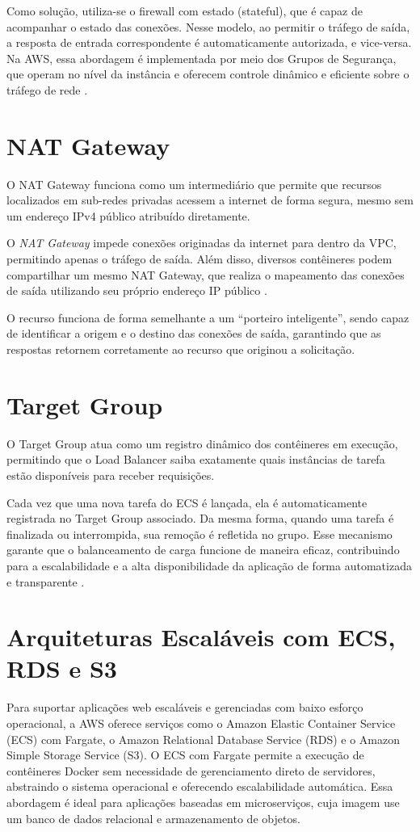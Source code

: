 Como solução, utiliza-se o firewall com estado (stateful), que é capaz de acompanhar o estado das conexões. Nesse modelo, ao permitir o tráfego de saída, a resposta de entrada correspondente é automaticamente autorizada, e vice-versa. Na AWS, essa abordagem é implementada por meio dos Grupos de Segurança, que operam no nível da instância e oferecem controle dinâmico e eficiente sobre o tráfego de rede \cite{fortinet2024firewall}.

\section{NAT Gateway}O NAT Gateway funciona como um intermediário que permite que recursos localizados em sub-redes privadas acessem a internet de forma segura, mesmo sem um endereço IPv4 público atribuído diretamente.

O \textit{NAT Gateway} impede conexões originadas da internet para dentro da VPC, permitindo apenas o tráfego de saída. Além disso, diversos contêineres podem compartilhar um mesmo NAT Gateway, que realiza o mapeamento das conexões de saída utilizando seu próprio endereço IP público \cite{google2024cloudnat}.

O recurso funciona de forma semelhante a um “porteiro inteligente”, sendo capaz de identificar a origem e o destino das conexões de saída, garantindo que as respostas retornem corretamente ao recurso que originou a solicitação.

\section{Target Group}O Target Group atua como um registro dinâmico dos contêineres em execução, permitindo que o Load Balancer saiba exatamente quais instâncias de tarefa estão disponíveis para receber requisições.

Cada vez que uma nova tarefa do ECS é lançada, ela é automaticamente registrada no Target Group associado. Da mesma forma, quando uma tarefa é finalizada ou interrompida, sua remoção é refletida no grupo. Esse mecanismo garante que o balanceamento de carga funcione de maneira eficaz, contribuindo para a escalabilidade e a alta disponibilidade da aplicação de forma automatizada e transparente \cite{aws2024targetgroup}. 

\section{Arquiteturas Escaláveis com ECS, RDS e S3}
Para suportar aplicações web escaláveis e gerenciadas com baixo esforço operacional, a AWS oferece serviços como o Amazon Elastic Container Service (ECS) com Fargate, o Amazon Relational Database Service (RDS) e o Amazon Simple Storage Service (S3). O ECS com Fargate permite a execução de contêineres Docker sem necessidade de gerenciamento direto de servidores, abstraindo o sistema operacional e oferecendo escalabilidade automática. Essa abordagem é ideal para aplicações baseadas em microserviços, cuja imagem use um banco de dados relacional e armazenamento de objetos.

